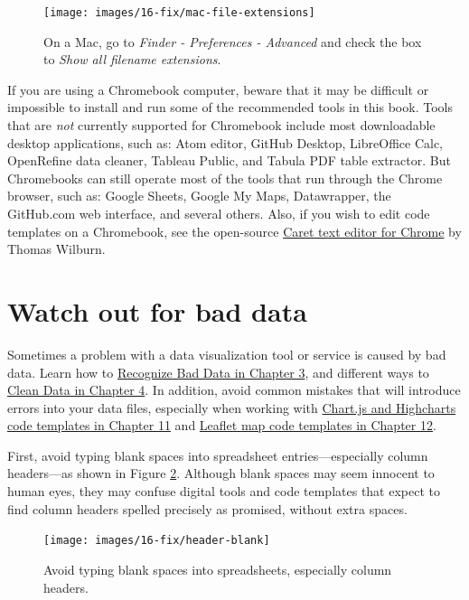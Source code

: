 \documentclass[
  english,
]{book}
\begin{document}
\begin{figure}
\texttt{[image: images/16-fix/mac-file-extensions]} \caption{On a Mac, go to \emph{Finder - Preferences - Advanced} and check the box to \emph{Show all filename extensions}.}\label{fig:mac-file-extensions2}
\end{figure}

If you are using a Chromebook computer, beware that it may be difficult or impossible to install and run some of the recommended tools in this book. Tools that are \emph{not} currently supported for Chromebook include most downloadable desktop applications, such as: Atom editor, GitHub Desktop, LibreOffice Calc, OpenRefine data cleaner, Tableau Public, and Tabula PDF table extractor. But Chromebooks can still operate most of the tools that run through the Chrome browser, such as: Google Sheets, Google My Maps, Datawrapper, the GitHub.com web interface, and several others. Also, if you wish to edit code templates on a Chromebook, see the open-source \href{https://thomaswilburn.net/caret/}{Caret text editor for Chrome} by Thomas Wilburn.

\hypertarget{fix-data}{%
\section{Watch out for bad data}\label{fix-data}}

Sometimes a problem with a data visualization tool or service is caused by bad data. Learn how to \href{bad-data.html}{Recognize Bad Data in Chapter 3}, and different ways to \href{clean.html}{Clean Data in Chapter 4}. In addition, avoid common mistakes that will introduce errors into your data files, especially when working with \href{chartcode.html}{Chart.js and Highcharts code templates in Chapter 11} and \href{leaflet.html}{Leaflet map code templates in Chapter 12}.

First, avoid typing blank spaces into spreadsheet entries---especially column headers---as shown in Figure \ref{fig:header-blank}. Although blank spaces may seem innocent to human eyes, they may confuse digital tools and code templates that expect to find column headers spelled precisely as promised, without extra spaces.



\begin{figure}
\texttt{[image: images/16-fix/header-blank]} \caption{Avoid typing blank spaces into spreadsheets, especially column headers.}\label{fig:header-blank}
\end{figure}
\end{document}
